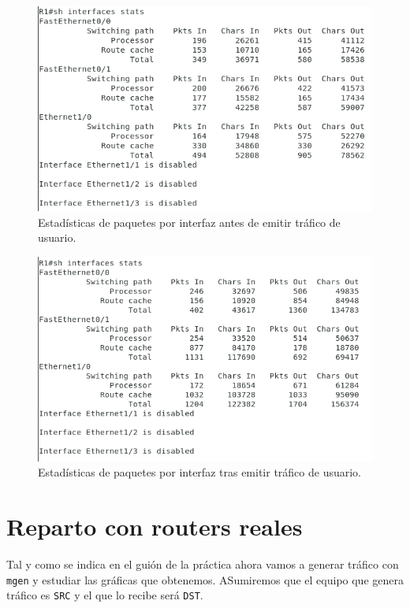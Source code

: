\documentclass[11pt]{article}
\begin{document}
            \begin{figure}
                \centering
                \includegraphics[width=0.6\linewidth]{ifaceStatsNoBalancingStart.png}
                \caption{Estadísticas de paquetes por interfaz antes de emitir tráfico de usuario.}
                \label{fig:ifaceStatsNoBalancingStart}
            \end{figure}

            \begin{figure}
                \centering
                \includegraphics[width=0.6\linewidth]{ifaceStatsNoBalancingEnd.png}
                \caption{Estadísticas de paquetes por interfaz tras emitir tráfico de usuario.}
                \label{fig:ifaceStatsNoBalancingEnd}
            \end{figure}

    \section{Reparto con routers reales}
            Tal y como se indica en el guión de la práctica ahora vamos a generar tráfico con \texttt{mgen} y estudiar las gráficas que obtenemos. ASumiremos que el equipo que genera tráfico es \texttt{SRC} y el que lo recibe será \texttt{DST}.
\end{document}
